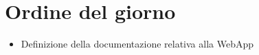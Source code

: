 \section{Ordine del giorno}

\begin{itemize}
    \item Definizione della documentazione relativa alla WebApp
\end{itemize}